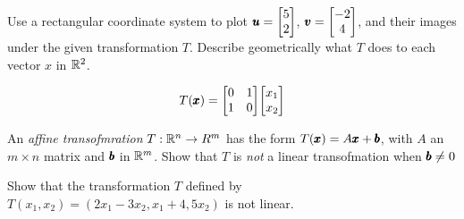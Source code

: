 \documentclass{../mathhomework}
\newenvironment{Mat}{\begin{bmatrix}}{\end{bmatrix}}
\begin{document}
\begin{problem}[1.8\#16]
    Use a rectangular coordinate system to plot $\Vect{u} = \begin{Mat}
        5 \\ 2
    \end{Mat}$, $\Vect{v} = \begin{Mat}
        -2 \\ 4
    \end{Mat}$, and their images under the given transformation $T$. Describe geometrically what $T$ does to each vector $x$ in $\mathbb{R}^2$.

    \begin{equation*}
        T(\Vect{x}) = \begin{Mat}
            0 & 1 \\
            1 & 0
        \end{Mat}
        \begin{Mat}
            x_1 \\ x_2
        \end{Mat}
    \end{equation*}
\end{problem}

\begin{problem}[1.8\#30]
    An \textit{affine transofmration} $T: \mathbb{R}^n \to R^m$ has the form $T(\pmb{x}) = A\pmb{x} + \pmb{b}$, with $A$ an $m \times n$ matrix and $\pmb{b}$ in $\mathbb{R}^m$.
    Show that $T$ is \textit{not} a linear transofmation when $\pmb{b} \neq 0$ 
\end{problem}

\begin{problem}[1.8\#33]
    Show that the transformation $T$ defined by $T(x_1,x_2) = (2x_1 - 3x_2, x_1 + 4, 5x_2)$ is not linear.
\end{problem}
\end{document}
